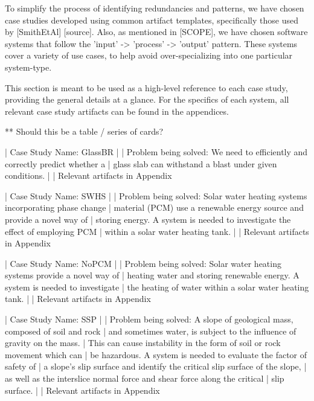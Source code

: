 To simplify the process of identifying redundancies and patterns, we have chosen
case studies developed using common artifact templates, specifically those 
used by [SmithEtAl] [source]. Also, as mentioned in [SCOPE], we have chosen
software systems that follow the 'input' -> 'process' -> 'output' pattern.
These systems cover a variety of use cases, to help avoid over-specializing into
one particular system-type. 

This section is meant to be used as a high-level reference to each case study, 
providing the general details at a glance. For the specifics of each system, 
all relevant case study artifacts can be found in the appendices.

** Should this be a table / series of cards?
 
 | Case Study Name: GlassBR
 | 
 | Problem being solved: We need to efficiently and correctly predict whether a 
 | glass slab can withstand a blast under given conditions.
 | 
 | Relevant artifacts in Appendix %

 | Case Study Name: SWHS
 | 
 | Problem being solved: Solar water heating systems incorporating phase change 
 | material (PCM) use a renewable energy source and provide a novel way of 
 | storing energy. A system is needed to investigate the effect of employing PCM
 | within a solar water heating tank. 
 | 
 | Relevant artifacts in Appendix %
 
 | Case Study Name: NoPCM
 | 
 | Problem being solved: Solar water heating systems provide a novel way of 
 | heating water and storing renewable energy. A system is needed to investigate
 | the heating of water within a solar water heating tank.
 | 
 | Relevant artifacts in Appendix %

 | Case Study Name: SSP
 | 
 | Problem being solved: A slope of geological mass, composed of soil and rock 
 | and sometimes water, is subject to the influence of gravity on the mass. 
 | This can cause instability in the form of soil or rock movement which can
 | be hazardous. A system is needed to evaluate the factor of safety of 
 | a slope's slip surface and identify the critical slip surface of the slope, 
 | as well as the interslice normal force and shear force along the critical 
 | slip surface. 
 | 
 | Relevant artifacts in Appendix %
 
